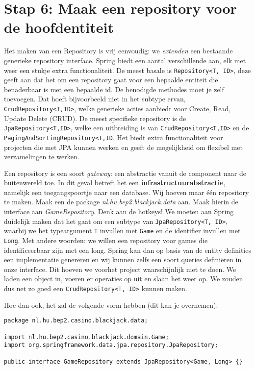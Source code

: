 \section{Stap 6: Maak een repository voor de hoofdentiteit}
Het maken van een Repository is vrij eenvoudig: we \textit{extenden} een bestaande 
generieke repository interface. Spring biedt een aantal verschillende aan, elk met 
weer een stukje extra functionaliteit. De meest basale is \texttt{Repository<T, ID>},
deze geeft aan dat het om een repository gaat voor een bepaalde entiteit die benaderbaar is 
met een bepaalde id. De benodigde methodes moet je zelf toevoegen. Dat hoeft bijvoorbeeld niet 
in het subtype ervan, \texttt{CrudRepository<T,ID>}, welke generieke acties aanbiedt voor
Create, Read, Update Delete (CRUD). De meest specifieke repository is de \texttt{JpaRepository<T,ID>},
welke een uitbreiding is van \texttt{CrudRepository<T,ID>} en de \texttt{PagingAndSortingRepository<T,ID}.
Het biedt extra functionaliteit voor projecten die met JPA kunnen werken
en geeft de mogelijkheid om flexibel met verzamelingen te werken.

Een repository is een soort \textit{gateway}: een abstractie vanuit de component naar de buitenwereld toe.
In dit geval betreft het een \textbf{infrastructuurabstractie}, namelijk een toegangspoortje naar een database.
Wij hoeven maar één repository te maken. Maak een de package \textit{nl.hu.bep2.blackjack.data} aan.
Maak hierin de interface aan \textit{GameRepository}. Denk aan de hotkeys!
We moeten aan Spring duidelijk maken dat het gaat om een subtype van \texttt{JpaRepository<T, ID>},
waarbij we het typeargument \texttt{T} invullen met \texttt{Game} en de identifier invullen met \texttt{Long}.
Met andere woorden: we willen een repository voor games die identificeerbaar zijn met een long.
Spring kan dan op basis van de entity definities een implementatie genereren en wij kunnen zelfs 
een soort queries definiëren in onze interface. 
Dit hoeven we voorhet project waarschijnlijk niet te doen.
We laden een object in, voeren er operaties op uit en slaan het weer op. 
We zouden dus net zo goed een \texttt{CrudRepository<T, ID>}
kunnen maken. 

Hoe dan ook, het zal de volgende vorm hebben 
(dit kan je overnemen):
\begin{verbatim}
package nl.hu.bep2.casino.blackjack.data;

import nl.hu.bep2.casino.blackjack.domain.Game;
import org.springframework.data.jpa.repository.JpaRepository;

public interface GameRepository extends JpaRepository<Game, Long> {}
\end{verbatim}

